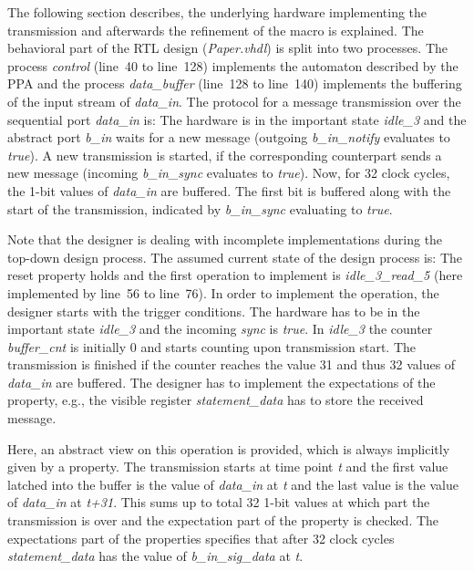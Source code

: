 The following section describes, the underlying hardware implementing the transmission and afterwards the refinement of the macro is explained.
The behavioral part of the RTL design (\textit{Paper.vhdl}) is split into two processes. 
The process \textit{control} (line~40 to line~128) implements the automaton described by the PPA and the process \textit{data\_buffer} (line~128 to line~140) implements the buffering of the input stream of \textit{data\_in}. 
The protocol for a message transmission over the sequential port \textit{data\_in} is: 
The hardware is in the important state \textit{idle\_3} and the abstract port \textit{b\_in} waits for a new message  (outgoing \textit{b\_in\_notify} evaluates to \textit{true}). 
A new transmission is started, if the corresponding counterpart sends a new message (incoming \textit{b\_in\_sync} evaluates to \textit{true}).
Now, for 32 clock cycles, the 1-bit values of \textit{data\_in} are buffered. 
The first bit is buffered along with the start of the transmission, indicated by \textit{b\_in\_sync} evaluating to \textit{true}.

Note that the designer is dealing with incomplete implementations during the top-down design process.
The assumed current state of the design process is: The reset property holds and the first operation to implement is \textit{idle\_3\_read\_5} (here implemented by line~56 to line~76). 
In order to implement the operation, the designer starts with the trigger conditions. 
The hardware has to be in the important state \textit{idle\_3} and the incoming \textit{sync} is \textit{true}.  
In \textit{idle\_3} the counter \textit{buffer\_cnt} is initially 0 and starts counting upon transmission start. 
The transmission is finished if the counter reaches the value 31 and thus 32 values of \textit{data\_in} are buffered.
The designer has to implement the expectations of the property, e.g., the visible register \textit{statement\_data} has to store the received message.

Here, an abstract view on this operation is provided, which is always implicitly given by a property. 
The transmission starts at time point \textit{t} and the first value latched into the buffer is the value of \textit{data\_in} at \textit{t} and the last value is the value of \textit{data\_in} at \textit{t+31}. 
This sums up to total 32 1-bit values at which part the transmission is over and the expectation part of the property is checked. 
The expectations part of the properties specifies that after 32 clock cycles \textit{statement\_data} has the value of \textit{b\_in\_sig\_data} at \textit{t}.


